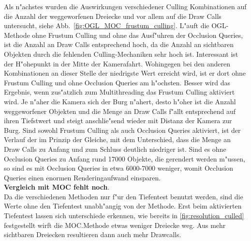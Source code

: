\documentclass[journal]{vgtc}
\begin{document}
Als n"achstes wurden die Auswirkungen verschiedener Culling Kombinationen auf die Anzahl der weggeworfenen Dreiecke und vor allem auf die Draw Calls untersucht, siehe Abb.\ \ref{fig:OGL_MOC_frustum_culling}.
L"auft die OGL-Methode ohne Frustum Culling und ohne das Ausf"uhren der Occlusion Queries, ist die Anzahl an Draw Calls entsprechend hoch, da die Anzahl an sichtbaren Objekten durch die fehlenden Culling-Mechaniken sehr hoch ist.
Interessant ist der H"ohepunkt in der Mitte der Kamerafahrt.
Wohingegen bei den anderen Kombinationen an dieser Stelle der niedrigste Wert erreicht wird, ist er dort ohne Frustum Culling und ohne Occlusion Queries am h"ochsten.
Besser wird das Ergebnis, wenn zus"atzlich zum Multithreading das Frustum Culling aktiviert wird.
Je n"aher die Kamera sich der Burg n"ahert, desto h"oher ist die Anzahl weggeworfener Objekten und die Menge an Draw Calls f"allt entsprechend auf ihren Tiefstwert und steigt anschlie"send wieder mit Distanz der Kamera zur Burg.
Sind sowohl Frustum Culling als auch Occlusion Queries aktiviert, ist der Verlauf der im Prinzip der Gleiche, mit dem Unterschied, dass die Menge an Draw Calls zu Anfang und zum Schluss deutlich niedriger ist.
Sind es ohne Occlusion Queries zu Anfang rund 17000 Objekte, die gerendert werden m"ussen, so sind es mit Occlusion Queries in etwa 6000-7000 weniger, womit Occlusion Queries einen enormen Renderingaufwand einsparen.\\
\textbf{Vergleich mit MOC fehlt noch}.\\
Da die verschiedenen Methoden nur f"ur den Tiefentest benutzt werden, sind die Werte ohne den Tiefentest unabh"angig von der Methode.
Erst beim aktivierten Tiefentest lassen sich unterschiede erkennen, wie bereits in \ref{fig:resolution_culled} festgestellt wirft die MOC.Methode etwas weniger Dreiecke weg.
Aus mehr sichtbaren Dreiecken resultieren dann auch mehr Drawcalls.
\end{document}
